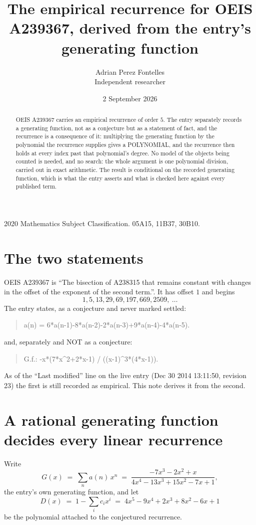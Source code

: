 \documentclass[11pt,a4paper]{article}
\title{The empirical recurrence for OEIS A239367, derived from the entry's generating function}
\author{Adrian Perez Fontelles\\ \small Independent researcher}
\date{2 September 2026}
\theoremstyle{plain}
\theoremstyle{definition}
\begin{document}
\maketitle

\begin{abstract}
OEIS A239367 carries an empirical recurrence of order $5$. The entry separately records a
generating function, not as a conjecture but as a statement of fact, and the recurrence is a
consequence of it: multiplying the generating function by the polynomial the recurrence
supplies gives a POLYNOMIAL, and the recurrence then holds at every index past that
polynomial's degree. No model of the objects being counted is needed, and no search: the
whole argument is one polynomial division, carried out in exact arithmetic. The result is
conditional on the recorded generating function, which is what the entry asserts and what is
checked here against every published term.
\end{abstract}

\noindent\small 2020 Mathematics Subject Classification. 05A15, 11B37, 30B10.\normalsize

\section{The two statements}

OEIS A239367 is ``The bisection of A238315 that remains constant with changes in the offset of the exponent of the second term.''. It has offset $1$ and begins
\[
1, 5, 13, 29, 69, 197, 669, 2509,\ \dots
\]
The entry states, as a conjecture and never marked settled:
\begin{quote}
a(n) = 6*a(n-1)-8*a(n-2)-2*a(n-3)+9*a(n-4)-4*a(n-5).
\end{quote}
and, separately and NOT as a conjecture:
\begin{quote}
G.f.: -x*(7*x\^{}2+2*x-1) / ((x-1)\^{}3*(4*x-1)).
\end{quote}
As of the ``Last modified'' line on the live entry (Dec 30 2014 13:11:50, revision 23) the first is still
recorded as empirical. This note derives it from the second.

\section{A rational generating function decides every linear recurrence}

Write
\[
G(x)\;=\;\sum_{n}a(n)\,x^{n}\;=\;\frac{- 7 x^{3} - 2 x^{2} + x}{4 x^{4} - 13 x^{3} + 15 x^{2} - 7 x + 1},
\]
the entry's own generating function, and let
\[
D(x)\;=\;1-\sum_i c_i x^{i}\;=\;4 x^{5} - 9 x^{4} + 2 x^{3} + 8 x^{2} - 6 x + 1
\]
be the polynomial attached to the conjectured recurrence.
\end{document}
